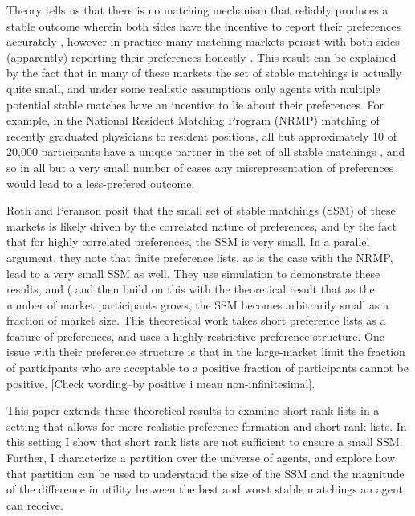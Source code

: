 \documentclass[WP]{AEA}
\begin{document}
Theory tells us that there is no matching mechanism that reliably produces a stable outcome wherein both sides have the incentive to report their preferences accurately \cite{Roth1985}, however in practice many matching markets persist with both sides (apparently) reporting their preferences honestly  \cite{Roth1991}. This result can be explained by the fact that in many of these markets the set of stable matchings is actually quite small, and under some realistic assumptions only agents with multiple potential stable matches have an incentive to lie about their preferences.  For example, in the National Resident Matching Program (NRMP) matching of recently graduated physicians to resident positions, all but approximately 10 of 20,000 participants have a unique partner in the set of all stable matchings \cite{Roth1999a}, and so in all but a very small number of cases any misrepresentation of preferences would lead to a less-prefered outcome. 


Roth and Peranson posit that the small set of stable matchings (SSM) of these markets is likely driven by the correlated nature of preferences, and by the fact that for highly correlated preferences, the SSM is very small.  In a parallel argument, they note that finite preference lists, as is the case with the NRMP, lead to a very small SSM as well.  They use simulation to demonstrate these results, and (\cite{Immorlica2005} and then \cite{Kojima2009} build on this with the theoretical result that as the number of market participants grows, the SSM becomes arbitrarily small as a fraction of market size. This theoretical work takes short preference lists as a feature of preferences, and uses a highly restrictive preference structure. One issue with their preference structure is that in the large-market limit the fraction of participants who are acceptable to a positive fraction of participants cannot be positive. [Check wording--by positive i mean non-infinitesimal].

This paper extends these theoretical results to examine short rank lists in a setting that allows for more realistic preference formation and short rank lists. In this setting I show that short rank lists are not sufficient to ensure a small SSM. Further, I characterize a partition over the universe of agents, and explore how that partition can be used to understand the size of the SSM and the magnitude of the difference in utility between the best and worst stable matchings an agent can receive.

\end{document}
